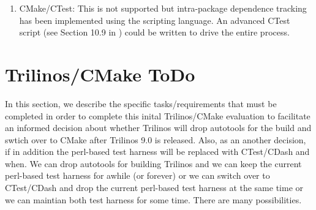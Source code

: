 \documentclass[pdf,ps2pdf,11pt]{SANDreport}
\begin{document}
\begin{enumerate}
\begin{enumerate}
  {}\item CMake/CTest: This is not supported but intra-package
  dependence tracking has been implemented using the scripting
  language.  An advanced CTest script (see Section 10.9 in
  {}\cite{MasteringCMake_fourth}) could be written to drive the entire
  process.

  \end{enumerate}

\end{enumerate}


%
\section{Trilinos/CMake ToDo}
%

In this section, we describe the specific tasks/requirements that must
be completed in order to complete this inital Trilinos/CMake
evaluation to facilitate an informed decision about whether Trilinos
will drop autotools for the build and swtich over to CMake after
Trilinos 9.0 is released.  Also, as an another decision, if in
addition the perl-based test harness will be replaced with CTest/CDash
and when.  We can drop autotools for building Trilinos and we can keep
the current perl-based test harness for awhile (or forever) or we can
switch over to CTest/CDash and drop the current perl-based test
harness at the same time or we can maintian both test harness for some
time.  There are many possibilities.
\end{document}
